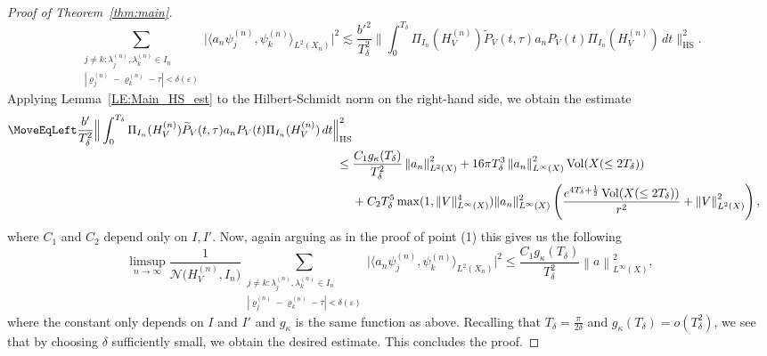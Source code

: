 \documentclass[11pt,twoside,reqno]{amsart}
\renewcommand{\rho}{\varrho}
\newcommand{\1}{\mathrm{\mathbf{1}}}
\newcommand{\bHS}{\mathrm{HS}}
\DeclareMathOperator{\Vol}{Vol}
\DeclareMathOperator{\vol}{Vol}
\newcommand{\norm}[1]{\left\lVert#1\right\rVert}
\numberwithin{equation}{section}
\theoremstyle{plain}
\theoremstyle{definition}
\theoremstyle{remark}
\begin{document}
\begin{proof}[Proof of Theorem~\ref{thm:main}]
\begin{equation*}
     \sum_{\substack{j\neq k: \lambda_j^{(n)},\lambda_k^{(n)}\in I_n \\ |\rho_{j}^{(n)}-\rho_{k}^{(n)}-\tau| < \delta(\varepsilon)}} \Big| \langle a_n \psi_j^{(n)} , \psi_k^{(n)}\rangle_{L^2(X_n)}  \Big|^2 
    \lesssim \frac{b'^2}{T_\delta^2} \Big\lVert \int_{0}^{T_\delta} \Pi_{I_n}(H_V^{(n)})\widetilde{P}_V(t,\tau) a_n P_V(t) \Pi_{I_n}(H_V^{(n)}) \, d t \Big\rVert_{\bHS}^2.
\end{equation*}
Applying Lemma~\ref{LE:Main_HS_est} to the Hilbert-Schmidt norm on the right-hand side, we obtain the estimate  
\begin{equation*}
    \begin{aligned}
     \MoveEqLeft \frac{b'}{T_\delta^2} \Big\lVert \int_{0}^{T_\delta} \Pi_{I_n}(H_V^{(n)})\widetilde{P}_V(t,\tau) a_n P_V(t) \Pi_{I_n}(H_V^{(n)}) \, d t \Big\rVert_{\bHS}^2 
    \\
    \leq{}& \frac{C_1 g_\kappa(T_\delta)}{T_\delta^2}  \norm{a_n}^2_{L^2(X)}+  16\pi T_\delta^3 \norm{a_n}_{L^\infty(X)}^2 \vol(X(\leq 2T_\delta))
       \\
       &+ C_2 T_\delta^5  \max(1, \lVert V\rVert_{L^\infty(X)}^4)  \lVert a_n \rVert^2_{L^\infty(X)}\left( \frac{  e^{4T_\delta +\frac12} \Vol(X(\leq2T_\delta))}{r^2} + \norm{V}_{L^2(X)}^2 \right),
    \end{aligned}
\end{equation*}
where $C_1$ and $C_2$ depend only on $I, I'$. Now, again arguing as in the proof of point (1) this gives us the following
\begin{equation*}
    \limsup_{n\rightarrow \infty}\frac{1}{\mathcal{N}\big(H_V^{(n)},I_n\big)}  \sum_{\substack{j\neq k: \lambda_j^{(n)},\lambda_k^{(n)}\in I_n \\ |\rho_{j}^{(n)}-\rho_{k}^{(n)}-\tau| < \delta(\varepsilon)}} \Big| \langle a_n \psi_j^{(n)} , \psi_k^{(n)}\rangle_{L^2(X_n)}  \Big|^2 \leq \frac{C_1 g_\kappa(T_\delta)}{T_\delta^2} \norm{a}^2_{L^\infty(X)},
\end{equation*}
where the constant only depends on $I$ and $I'$ and $g_\kappa$ is the same function as above. Recalling that $T_\delta= \frac{\pi}{2\delta}$ and $g_\kappa(T_\delta)=o(T_\delta^2)$, we see that by choosing $\delta$ sufficiently small, we obtain the desired estimate. This concludes the proof.
\end{proof}
\end{document}
